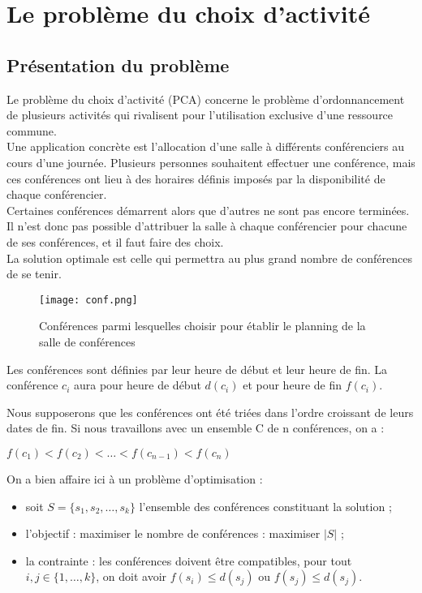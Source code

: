 \section*{Le problème du choix d'activité}
\subsection*{Présentation du problème}

Le problème du choix d'activité (PCA) concerne le problème d'ordonnancement de plusieurs activités qui rivalisent pour l'utilisation exclusive d'une ressource commune.\\
Une application concrète est l'allocation d'une salle à différents conférenciers au cours d'une journée. Plusieurs personnes souhaitent effectuer une conférence, mais ces conférences ont lieu à des horaires définis imposés par la disponibilité de chaque conférencier.\\
 Certaines conférences démarrent alors que d'autres ne sont pas encore terminées. Il n'est donc pas possible d'attribuer la salle à chaque conférencier pour chacune de ses conférences, et il faut faire des choix.\\ 
La solution optimale est celle qui permettra au plus grand nombre de conférences de se tenir.


\begin{figure}[h]
	\centering
		\texttt{[image: conf.png]}
		\caption{Conférences parmi lesquelles choisir pour établir le planning de la salle de conférences}
	\label{fig:conf}
\end{figure}


Les conférences sont définies par leur heure de début et leur heure de fin. La conférence $c_i$ aura pour heure de début $d(c_i)$ et pour heure de fin $f(c_i)$.

Nous supposerons que les conférences ont été triées dans l'ordre croissant de leurs dates de fin. Si nous travaillons avec un ensemble C de n conférences, on a :
\begin{center} 
$f(c_1)<f(c_2)<\ldots<f(c_{n-1})<f(c_n)$
\end{center} 

On a bien affaire ici à un problème d'optimisation :
\begin{itemize}
\item soit $S={\{s_1,s_2,\ldots,s_k\}}$ l'ensemble des conférences constituant la solution ;
\item l'objectif : maximiser le nombre de conférences : maximiser $|S|$ ;
\item la contrainte :  les conférences doivent être compatibles, pour tout $i,j\in {\{1,…,k\}}$, on doit avoir $f(s_i )\leqslant d(s_j)$ ou $f(s_j )\leqslant d(s_j)$.
\end{itemize}

